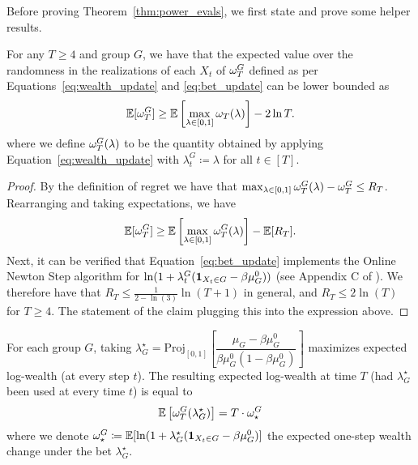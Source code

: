 Before proving Theorem~\ref{thm:power_evals}, we first state and prove some helper results. 

\begin{claim}
\label{claim:logwealth-regret} For any $T\geq 4$ and group $G$, we have that the expected value over the randomness in the realizations of each $X_t$ of $\omega_T^G$  defined as per Equations~\eqref{eq:wealth_update} and \eqref{eq:bet_update} can be lower bounded as
\[
\mathbb{E}[\omega_T^G] \geq \mathbb{E}\left[\max_{\lambda\in[0, 1]} \omega_T(\lambda)\right] - 2 \ln T.
\]
where we define $\omega_T^G(\lambda)$ to be the quantity obtained by applying Equation~\eqref{eq:wealth_update} with $\lambda_t^G \coloneqq \lambda$ for all $t\in[T]$.
\end{claim}
\begin{proof} By the definition of regret we have that 
$\max_{\lambda\in[0, 1]} \omega_T^G(\lambda) - \omega_T^G \leq R_T$.
Rearranging and taking expectations, we have 
\[ \mathbb{E}[\omega_T^G] \geq \mathbb{E}\left[\max_{\lambda\in[0, 1]} \omega_T^G(\lambda)\right] -  \mathbb{E}[R_T].\]
Next, it can be verified that Equation~\eqref{eq:bet_update} implements the Online Newton Step algorithm for $\ln(1 + \lambda_t^G(\mathbf{1}_{X_t \in G} - \beta{\mu_G^0}))$ (see Appendix C of \citet{cutkosky2018black}). We therefore have that $R_T \leq \frac{1}{2-\ln(3)}\ln(T  + 1)$ in general, and $R_T \leq 2\ln(T)$ for $T \geq 4.$ 
The statement of the claim plugging this into the expression above.
\end{proof}

\begin{lemma}\label{lem:lambda_opt} 
For each group $G$, taking $\lambda^\star_G = \mathrm{Proj}_{[0,1]}\left[\dfrac{\mu_G - \beta \mu_G^0}{\beta\mu_G^0(1-\beta\mu_G^0)}\right]$ maximizes expected log-wealth (at every step $t$). The resulting expected log-wealth at time $T$ (had $\lambda_G^\star$ been used at every time $t$) is equal to
\[
\mathbb{E}\left[\omega_T^G(\lambda^\star_G)\right] = T\cdot \omega_\star^G 
\]
where we denote $\omega_\star^G \coloneqq \mathbb{E}[\ln(1+\lambda_G^\star(\mathbf{1}_{X_t\in G} - \beta{\mu_G^0})]$ the expected one-step wealth change under the bet $\lambda^\star_G$.
\end{lemma}

